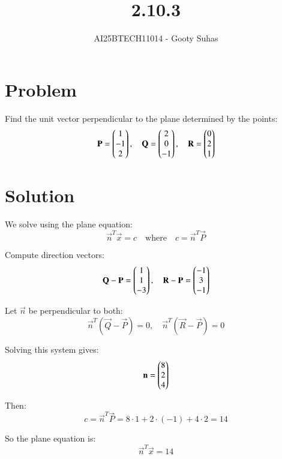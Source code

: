 \documentclass[journal]{IEEEtran}
\begin{document}

\vspace{3cm}

\title{2.10.3}
\author{AI25BTECH11014 - Gooty Suhas}
{\let\newpage\relax\maketitle}

\renewcommand{\thefigure}{\theenumi}
\renewcommand{\thetable}{\theenumi}
\setlength{\intextsep}{10pt}
\renewcommand{\thetable}{\theenumi}

\section*{\large\textbf{Problem}}

Find the unit vector perpendicular to the plane determined by the points:
\[
\mathbf{P} = \begin{pmatrix}1 \\ -1 \\ 2\end{pmatrix}, \quad
\mathbf{Q} = \begin{pmatrix}2 \\ 0 \\ -1\end{pmatrix}, \quad
\mathbf{R} = \begin{pmatrix}0 \\ 2 \\ 1\end{pmatrix}
\]

\section*{\large\textbf{Solution}}

We solve using the plane equation:
\[
\vec{n}^T \vec{x} = c
\quad \text{where} \quad
c = \vec{n}^T \vec{P}
\]

Compute direction vectors:
\[
\mathbf{Q} - \mathbf{P} = \begin{pmatrix}1 \\ 1 \\ -3\end{pmatrix}, \quad
\mathbf{R} - \mathbf{P} = \begin{pmatrix}-1 \\ 3 \\ -1\end{pmatrix}
\]

Let \( \vec{n} \) be perpendicular to both:
\[
\vec{n}^T (\vec{Q} - \vec{P}) = 0, \quad
\vec{n}^T (\vec{R} - \vec{P}) = 0
\]

Solving this system gives:
\[
\mathbf{n} = \begin{pmatrix}8 \\ 2 \\ 4\end{pmatrix}
\]

Then:
\[
c = \vec{n}^T \vec{P}
= 8 \cdot 1 + 2 \cdot (-1) + 4 \cdot 2 = 14
\]

So the plane equation is:
\[
\vec{n}^T \vec{x} = 14
\]
\end{document}
